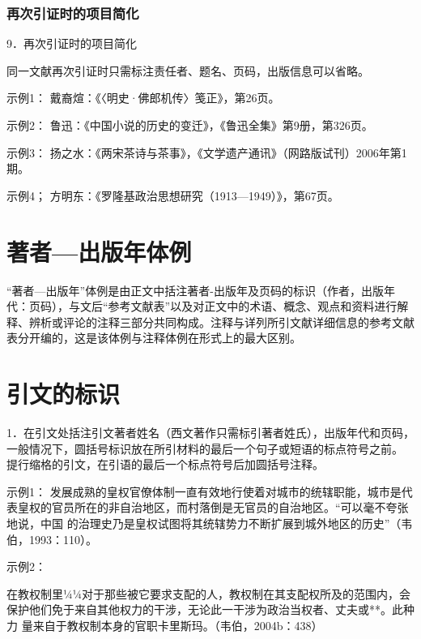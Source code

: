 \documentclass{article}
\begin{document}
\subsubsection{再次引证时的项目简化}

9．再次引证时的项目简化

同一文献再次引证时只需标注责任者、题名、页码，出版信息可以省略。

示例1：
戴裔煊：《〈明史·佛郎机传〉笺正》，第26页。

示例2：
鲁迅：《中国小说的历史的变迁》，《鲁迅全集》第9册，第326页。

示例3：
扬之水：《两宋茶诗与茶事》，《文学遗产通讯》（网路版试刊）2006年第1期。


示例4；
方明东：《罗隆基政治思想研究（1913—1949）》，第67页。


\section{著者—出版年体例}

“著者—出版年”体例是由正文中括注著者-出版年及页码的标识（作者，出版年代：页码），与文后“参考文献表”以及对正文中的术语、概念、观点和资料进行解
释、辨析或评论的注释三部分共同构成。注释与详列所引文献详细信息的参考文献表分开编的，这是该体例与注释体例在形式上的最大区别。

\section{引文的标识}

1．在引文处括注引文著者姓名（西文著作只需标引著者姓氏），出版年代和页码，一般情况下，圆括号标识放在所引材料的最后一个句子或短语的标点符号之前。
提行缩格的引文，在引语的最后一个标点符号后加圆括号注释。

示例1：
发展成熟的皇权官僚体制一直有效地行使着对城市的统辖职能，城市是代表皇权的官员所在的非自治地区，而村落倒是无官员的自治地区。“可以毫不夸张地说，中国
的治理史乃是皇权试图将其统辖势力不断扩展到城外地区的历史”（韦伯，1993：110）。

示例2：

在教权制里¼¼对于那些被它要求支配的人，教权制在其支配权所及的范围内，会保护他们免于来自其他权力的干涉，无论此一干涉为政治当权者、丈夫或**。此种力
量来自于教权制本身的官职卡里斯玛。（韦伯，2004b：438）



\newpage
\printbibliography[heading=bibliography]
\end{document}
